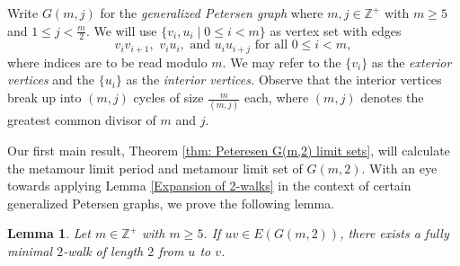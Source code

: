 \documentclass[12pt]{amsart}
\newtheorem{lemma}[theorem]{Lemma}
\theoremstyle{definition}
\theoremstyle{remark}
\numberwithin{equation}{section}
\numberwithin{figure}{section}
\newcommand{\M}{\operatorname{M}}
\newcommand{\N}{\mathbb{N}}
\newcommand{\Z}{\mathbb{Z}}
\begin{document}
    

Write $G(m,j)$ for the \emph{generalized Petersen graph} where $m,j\in\Z^+$ with $m\geq 5$ and $1\leq j < \frac{m}{2}$. We will use $\{v_i, u_i \mid 0\le i < m\}$ as vertex set with edges
\[ v_i v_{i+1}, \,\, v_i u_i, \text{ and } u_i u_{i+j} \text{ for all } 0\le i<m, \]
where indices are to be read modulo $m$. We may refer to the $\{v_i\}$ as the \emph{exterior vertices} and the $\{u_i\}$ as the \emph{interior vertices.}
Observe that the interior vertices break up into $(m,j)$ cycles of size $\frac{m}{(m,j)}$ each, where $(m,j)$ denotes the greatest common divisor of $m$ and $j$.

Our first main result, Theorem \ref{thm: Peteresen G(m,2) limit sets}, will calculate the metamour limit period and metamour limit set of $G(m,2)$.
With an eye towards applying Lemma \ref{Expansion of 2-walks} in the context of certain generalized Petersen graphs, we prove the following lemma.
\begin{lemma} \label{2-walk of length 2 in G(m,2)}
    Let $m\in\Z^+$ with $m\geq 5$. If $uv \in E(G(m,2))$, there exists a fully minimal $2$-walk of length $2$ from $u$ to $v$.
\end{lemma}
\end{document}
